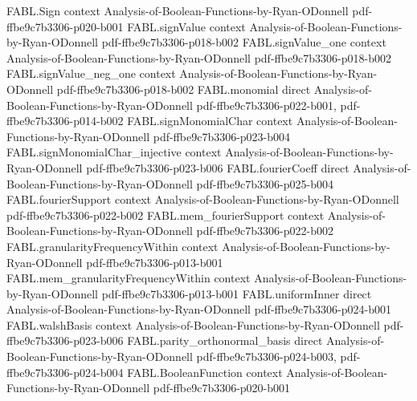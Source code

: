 \begin{theorem}
\label{FABL.monotoneOn_noiseSensitivityCurve}
\leanok
{}
\proofstep
  {FABL.Sign}
  {context}
  {Analysis-of-Boolean-Functions-by-Ryan-ODonnell}
  {pdf-ffbe9c7b3306-p020-b001}
\proofstep
  {FABL.signValue}
  {context}
  {Analysis-of-Boolean-Functions-by-Ryan-ODonnell}
  {pdf-ffbe9c7b3306-p018-b002}
\proofstep
  {FABL.signValue_one}
  {context}
  {Analysis-of-Boolean-Functions-by-Ryan-ODonnell}
  {pdf-ffbe9c7b3306-p018-b002}
\proofstep
  {FABL.signValue_neg_one}
  {context}
  {Analysis-of-Boolean-Functions-by-Ryan-ODonnell}
  {pdf-ffbe9c7b3306-p018-b002}
\proofstep
  {FABL.monomial}
  {direct}
  {Analysis-of-Boolean-Functions-by-Ryan-ODonnell}
  {pdf-ffbe9c7b3306-p022-b001,
    pdf-ffbe9c7b3306-p014-b002}
\proofstep
  {FABL.signMonomialChar}
  {context}
  {Analysis-of-Boolean-Functions-by-Ryan-ODonnell}
  {pdf-ffbe9c7b3306-p023-b004}
\proofstep
  {FABL.signMonomialChar_injective}
  {context}
  {Analysis-of-Boolean-Functions-by-Ryan-ODonnell}
  {pdf-ffbe9c7b3306-p023-b006}
\proofstep
  {FABL.fourierCoeff}
  {direct}
  {Analysis-of-Boolean-Functions-by-Ryan-ODonnell}
  {pdf-ffbe9c7b3306-p025-b004}
\proofstep
  {FABL.fourierSupport}
  {context}
  {Analysis-of-Boolean-Functions-by-Ryan-ODonnell}
  {pdf-ffbe9c7b3306-p022-b002}
\proofstep
  {FABL.mem_fourierSupport}
  {context}
  {Analysis-of-Boolean-Functions-by-Ryan-ODonnell}
  {pdf-ffbe9c7b3306-p022-b002}
\proofstep
  {FABL.granularityFrequencyWithin}
  {context}
  {Analysis-of-Boolean-Functions-by-Ryan-ODonnell}
  {pdf-ffbe9c7b3306-p013-b001}
\proofstep
  {FABL.mem_granularityFrequencyWithin}
  {context}
  {Analysis-of-Boolean-Functions-by-Ryan-ODonnell}
  {pdf-ffbe9c7b3306-p013-b001}
\proofstep
  {FABL.uniformInner}
  {direct}
  {Analysis-of-Boolean-Functions-by-Ryan-ODonnell}
  {pdf-ffbe9c7b3306-p024-b001}
\proofstep
  {FABL.walshBasis}
  {context}
  {Analysis-of-Boolean-Functions-by-Ryan-ODonnell}
  {pdf-ffbe9c7b3306-p023-b006}
\proofstep
  {FABL.parity_orthonormal_basis}
  {direct}
  {Analysis-of-Boolean-Functions-by-Ryan-ODonnell}
  {pdf-ffbe9c7b3306-p024-b003,
    pdf-ffbe9c7b3306-p024-b004}
\proofstep
  {FABL.BooleanFunction}
  {context}
  {Analysis-of-Boolean-Functions-by-Ryan-ODonnell}
  {pdf-ffbe9c7b3306-p020-b001}
\proofstep

\end{theorem}
